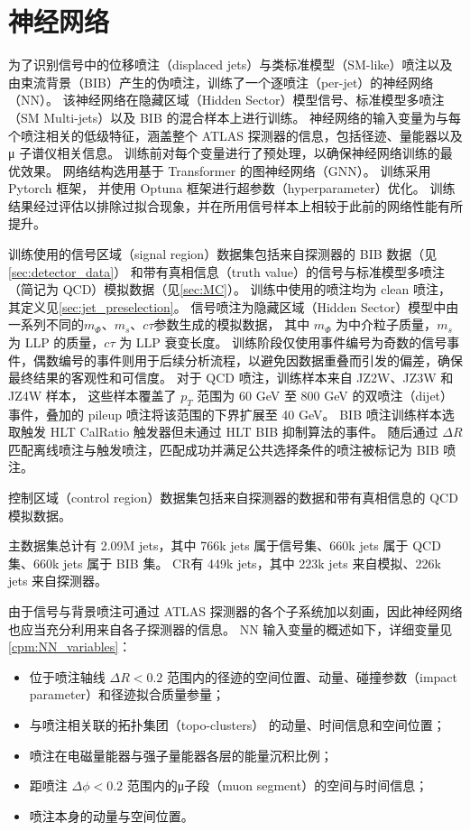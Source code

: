 
\chapter{神经网络}
\label{chap:NN}

为了识别信号中的位移喷注（displaced jets）与类标准模型（SM-like）喷注以及由束流背景（BIB）产生的伪喷注，训练了一个逐喷注（per-jet）的神经网络（NN）。
该神经网络在隐藏区域（Hidden Sector）模型信号、标准模型多喷注（SM Multi-jets）以及 BIB 的混合样本上进行训练。
神经网络的输入变量为与每个喷注相关的低级特征，涵盖整个 ATLAS 探测器的信息，包括径迹、量能器以及 μ 子谱仪相关信息。
训练前对每个变量进行了预处理，以确保神经网络训练的最优效果。
网络结构选用基于 Transformer\cite{vaswani2023attentionneed} 的图神经网络（GNN）。
训练采用 Pytorch\cite{paszke2019pytorchimperativestylehighperformance} 框架，
并使用 Optuna\cite{akiba2019optunanextgenerationhyperparameteroptimization} 框架进行超参数（hyperparameter）优化。
训练结果经过评估以排除过拟合现象，并在所用信号样本上相较于此前的网络性能有所提升。

训练使用的信号区域（signal region）数据集包括来自探测器的 BIB 数据（见\autoref{sec:detector_data}）
和带有真相信息（truth value）的信号与标准模型多喷注（简记为 QCD）模拟数据（见\autoref{sec:MC}）。
训练中使用的喷注均为 clean 喷注，其定义见\autoref{sec:jet_preselection}。
信号喷注为隐藏区域（Hidden Sector）模型中由一系列不同的$m_\Phi$、$m_s$、$c\tau$参数生成的模拟数据，
其中 $m_\Phi$ 为中介粒子质量，$m_s$ 为 LLP 的质量，$c\tau$ 为 LLP 衰变长度。
训练阶段仅使用事件编号为奇数的信号事件，偶数编号的事件则用于后续分析流程，以避免因数据重叠而引发的偏差，确保最终结果的客观性和可信度。
对于 QCD 喷注，训练样本来自 JZ2W、JZ3W 和 JZ4W 样本，
这些样本覆盖了 $p_T$ 范围为 60 GeV 至 800 GeV 的双喷注（dijet）事件，叠加的 pileup 喷注将该范围的下界扩展至 40 GeV。
BIB 喷注训练样本选取触发 HLT CalRatio 触发器但未通过 HLT BIB 抑制算法的事件。
随后通过 $\Delta R$ 匹配离线喷注与触发喷注，匹配成功并满足公共选择条件的喷注被标记为 BIB 喷注。

控制区域（control region）数据集包括来自探测器的数据和带有真相信息的 QCD 模拟数据。

主数据集总计有 2.09M jets，其中 766k jets 属于信号集、660k jets 属于 QCD 集、660k jets 属于 BIB 集。
CR有 449k jets，其中 223k jets 来自模拟、226k jets 来自探测器。

由于信号与背景喷注可通过 ATLAS 探测器的各个子系统加以刻画，因此神经网络也应当充分利用来自各子探测器的信息。
NN 输入变量的概述如下，详细变量见\autoref{cpm:NN_variables}：
\begin{itemize}
    \item 位于喷注轴线 $\Delta R < 0.2$ 范围内的径迹的空间位置、动量、碰撞参数（impact parameter）和径迹拟合质量参量；
    \item 与喷注相关联的拓扑集团（topo-clusters） 的动量、时间信息和空间位置；
    \item 喷注在电磁量能器与强子量能器各层的能量沉积比例；
    \item 距喷注 $\Delta \phi < 0.2$ 范围内的μ子段（muon segment）的空间与时间信息；
    \item 喷注本身的动量与空间位置。
\end{itemize}

